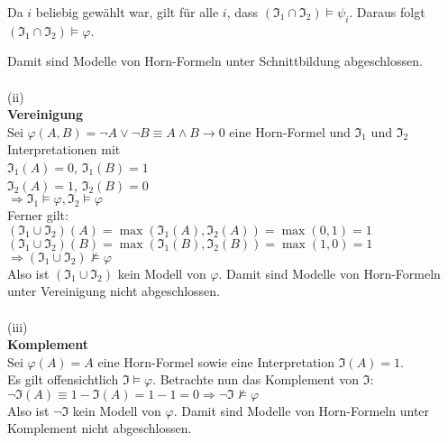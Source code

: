 \documentclass[11pt, a4paper]{article}
\begin{document}
\begin{adjustwidth}{20pt}{20pt}
\noindent Da $i$ beliebig gewählt war, gilt für alle $i$, dass $(\mathfrak{I_1} \cap \mathfrak{I_2}) \models \psi_i$. Daraus folgt $(\mathfrak{I_1} \cap \mathfrak{I_2}) \models \varphi$.

\noindent Damit sind Modelle von Horn-Formeln unter Schnittbildung abgeschlossen.\\ \ \\
\noindent (ii)\\
\textbf{Vereinigung}\\
Sei $\varphi(A,B) = \neg A \vee \neg B  \equiv A \wedge B \rightarrow 0$ eine Horn-Formel und $\mathfrak{I_1}$ und $\mathfrak{I_2}$ Interpretationen mit\\
$\mathfrak{I_1}(A)=0$, $\mathfrak{I_1}(B)=1$\\
$\mathfrak{I_2}(A)=1$, $\mathfrak{I_2}(B)=0$\\
$\Rightarrow \mathfrak{I_1} \models \varphi, \mathfrak{I_2} \models \varphi$\\

\noindent Ferner gilt:\\ 
$(\mathfrak{I_1} \cup \mathfrak{I_2})(A)= \max(\mathfrak{I_1}(A),\mathfrak{I_2}(A)) = \max(0,1) = 1$\\
$(\mathfrak{I_1} \cup \mathfrak{I_2})(B)= \max(\mathfrak{I_1}(B),\mathfrak{I_2}(B)) = \max(1,0) = 1$\\
$\Rightarrow (\mathfrak{I_1} \cup \mathfrak{I_2}) \not\models \varphi$\\

\noindent Also ist $(\mathfrak{I_1} \cup \mathfrak{I_2})$ kein Modell von $\varphi$. Damit sind Modelle von Horn-Formeln unter Vereinigung nicht abgeschlossen.\\ \ \\
(iii)\\
\textbf{Komplement}\\
Sei $\varphi(A)=A$ eine Horn-Formel sowie eine Interpretation $\mathfrak{I}(A)=1$.\\
 Es gilt offensichtlich $\mathfrak{I} \models \varphi$. Betrachte nun das Komplement von $\mathfrak{I}$:\\
 $\neg \mathfrak{I} (A) \equiv 1 - \mathfrak{I}(A) = 1- 1=0 \Rightarrow \neg \mathfrak{I} \not\models \varphi$\\
 
\noindent Also ist $\neg \mathfrak{I}$ kein Modell von $\varphi$. Damit sind Modelle von Horn-Formeln unter Komplement nicht abgeschlossen. 
\end{adjustwidth}
\end{document}
